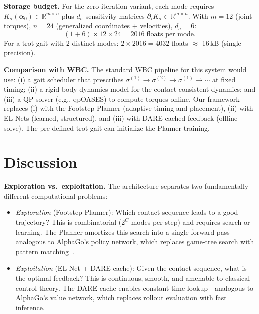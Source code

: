 \documentclass[letterpaper, 10pt, conference]{IEEEtran}
\newcommand{\R}{\mathbb{R}}
\newcommand{\balpha}{\bm{\alpha}}
\begin{document}
\textbf{Storage budget.}
For the zero-iteration variant, each mode requires
$K_\sigma(\balpha_0) \in \R^{m \times n}$
plus $d_\sigma$ sensitivity matrices
$\partial_i K_\sigma \in \R^{m \times n}$.
With $m = 12$ (joint torques), $n = 24$ (generalized
coordinates + velocities), $d_\sigma = 6$:
\[
  (1 + 6) \times 12 \times 24 = 2016 \;\text{floats per mode}.
\]
For a trot gait with 2 distinct modes:
$2 \times 2016 = 4032$ floats $\approx$ 16\,kB
(single precision).

\textbf{Comparison with WBC.}
The standard WBC pipeline for this system would use:
(i) a gait scheduler that prescribes $\sigma^{(1)} \to
\sigma^{(2)} \to \sigma^{(1)} \to \cdots$ at fixed timing;
(ii) a rigid-body dynamics model for the contact-consistent
dynamics; and (iii) a QP solver (e.g., qpOASES) to compute
torques online.
Our framework replaces (i) with the Footstep Planner
(adaptive timing and placement),
(ii) with EL-Nets (learned, structured),
and (iii) with DARE-cached feedback (offline solve).
The pre-defined trot gait can initialize the Planner
training.

\section{Discussion}\label{sec:discussion}

\textbf{Exploration vs.\ exploitation.}
The architecture separates two fundamentally different
computational problems:
\begin{itemize}
  \item \emph{Exploration} (Footstep Planner):
    Which contact sequence leads to a good trajectory?
    This is combinatorial ($2^C$ modes per step) and requires
    search or learning.
    The Planner amortizes this search into a single
    forward pass---analogous to AlphaGo's policy network,
    which replaces game-tree search with pattern
    matching~\cite{silver2016}.
  \item \emph{Exploitation} (EL-Net + DARE cache):
    Given the contact sequence, what is the optimal feedback?
    This is continuous, smooth, and amenable to classical
    control theory.
    The DARE cache enables constant-time lookup---analogous
    to AlphaGo's value network, which replaces rollout
    evaluation with fast inference.
\end{itemize}
\end{document}

